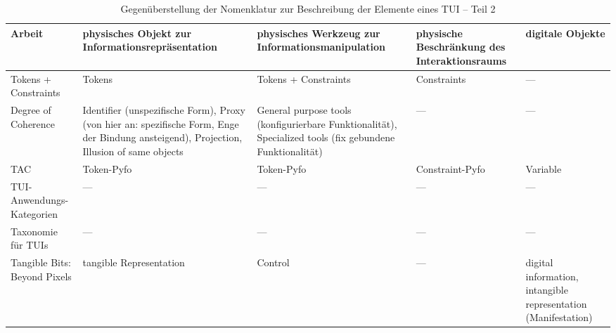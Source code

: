 \begin{table}[htbp]
		\centering
	\caption{Gegenüberstellung der Nomenklatur zur Beschreibung der Elemente eines TUI -- Teil 2}  
	\begin{tabular}{|p{2.2cm}||p{3cm}|p{3cm}|p{2cm}|p{2cm}|} \hline
			Arbeit & physisches Objekt zur Informations\-repräsentation & physisches Werkzeug zur Informations\-manipulation & physische Beschränkung des Interaktionsraums & digitale Objekte \\ \hline \hline
		Tokens + Constraints & Tokens & Tokens + Constraints & Constraints & --- \\ \hline
		Degree of Coherence & Identifier (unspezifische Form), Proxy (von hier an: spezifische Form, Enge der Bindung ansteigend), Projection, Illusion of same objects & General purpose tools (konfigurierbare Funktionalität), Specialized tools (fix gebundene Funktionalität) & --- & --- \\ \hline
		TAC & Token-Pyfo & Token-Pyfo & Constraint-Pyfo & Variable \\ \hline
		TUI-Anwendungs-Kategorien & --- & --- & --- & --- \\ \hline
		Taxonomie für TUIs & --- & --- & --- & --- \\ \hline
		Tangible Bits: Beyond Pixels & tangible Represen\-tation & Control & --- & digital information, intangible representation (Manifestation) \\ \hline
	\end{tabular}
	\label{tab:tui_nomenklatur2}
\end{table}


